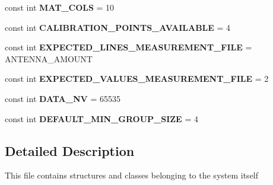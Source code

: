 \begin{DoxyCompactItemize}
\item 
\hypertarget{namespace_p_r_p_s_evolution_a1aa466bc495517d4f6a304abbd69f726}{const int {\bfseries M\-A\-T\-\_\-\-C\-O\-L\-S} = 10}\label{namespace_p_r_p_s_evolution_a1aa466bc495517d4f6a304abbd69f726}

\item 
\hypertarget{namespace_p_r_p_s_evolution_a7458d510a1d4ecbc3f5755158925c481}{const int {\bfseries C\-A\-L\-I\-B\-R\-A\-T\-I\-O\-N\-\_\-\-P\-O\-I\-N\-T\-S\-\_\-\-A\-V\-A\-I\-L\-A\-B\-L\-E} = 4}\label{namespace_p_r_p_s_evolution_a7458d510a1d4ecbc3f5755158925c481}

\item 
\hypertarget{namespace_p_r_p_s_evolution_a779c5864ab571a7d298fd91ade6054a6}{const int {\bfseries E\-X\-P\-E\-C\-T\-E\-D\-\_\-\-L\-I\-N\-E\-S\-\_\-\-M\-E\-A\-S\-U\-R\-E\-M\-E\-N\-T\-\_\-\-F\-I\-L\-E} = A\-N\-T\-E\-N\-N\-A\-\_\-\-A\-M\-O\-U\-N\-T}\label{namespace_p_r_p_s_evolution_a779c5864ab571a7d298fd91ade6054a6}

\item 
\hypertarget{namespace_p_r_p_s_evolution_a5f7e46953736ee6382e8eb482f78e366}{const int {\bfseries E\-X\-P\-E\-C\-T\-E\-D\-\_\-\-V\-A\-L\-U\-E\-S\-\_\-\-M\-E\-A\-S\-U\-R\-E\-M\-E\-N\-T\-\_\-\-F\-I\-L\-E} = 2}\label{namespace_p_r_p_s_evolution_a5f7e46953736ee6382e8eb482f78e366}

\item 
\hypertarget{namespace_p_r_p_s_evolution_a55671646df338188f3fd8f1f30226b25}{const int {\bfseries D\-A\-T\-A\-\_\-\-N\-V} = 65535}\label{namespace_p_r_p_s_evolution_a55671646df338188f3fd8f1f30226b25}

\item 
\hypertarget{namespace_p_r_p_s_evolution_a578fcad2da213d6bae4f962fb90babd6}{const int {\bfseries D\-E\-F\-A\-U\-L\-T\-\_\-\-M\-I\-N\-\_\-\-G\-R\-O\-U\-P\-\_\-\-S\-I\-Z\-E} = 4}\label{namespace_p_r_p_s_evolution_a578fcad2da213d6bae4f962fb90babd6}

\end{DoxyCompactItemize}


\subsection{Detailed Description}
This file contains structures and classes belonging to the system itself 